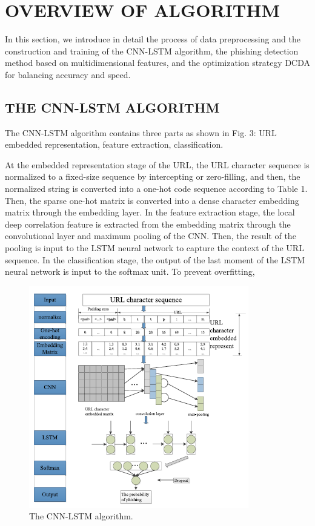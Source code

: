 \documentclass{ieeeaccess}
\begin{document}
\section{OVERVIEW OF ALGORITHM}
In this section, we introduce in detail the process of data
preprocessing and the construction and training of the
CNN-LSTM algorithm, the phishing detection method based
on multidimensional features, and the optimization strategy
DCDA for balancing accuracy and speed.\vspace{6pt}
\subsection{THE CNN-LSTM ALGORITHM}
The CNN-LSTM algorithm contains three parts as shown
in Fig. 3: URL embedded representation, feature extraction,
classification. \par At the embedded representation stage of the URL, the URL
character sequence is normalized to a fixed-size sequence by
intercepting or zero-filling, and then, the normalized string is
converted into a one-hot code sequence according to Table 1.
Then, the sparse one-hot matrix is converted into a dense
character embedding matrix through the embedding layer.
In the feature extraction stage, the local deep correlation
feature is extracted from the embedding matrix through the
convolutional layer and maximum pooling of the CNN. Then,
the result of the pooling is input to the LSTM neural network
to capture the context of the URL sequence. In the classification
stage, the output of the last moment of the LSTM neural
network is input to the softmax unit. To prevent overfitting,
\begin{figure}
    \centering
    \includegraphics[width=\linewidth]{figure3.png}
    \caption{The CNN-LSTM algorithm.}
    \label{fig:3}
\end{figure}
\end{document}
